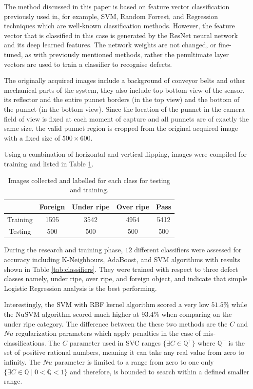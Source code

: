 \documentclass[fleqn,twoside]{article}
\begin{document}
The method discussed in this paper is based on feature vector classification previously used in, for example, SVM, Random Forrest, and Regression techniques which are well-known classification methods. However, the feature vector that is classified in this case is generated by the ResNet neural network and its deep learned features. The network weights are not changed, or fine-tuned, as with previously mentioned methods, rather the penultimate layer vectors are used to train a classifier to recognise defects. 

The originally acquired images include a background of conveyor belts and other mechanical parts of the system, they also include top-bottom view of the sensor, its reflector and the entire punnet borders (in the top view) and the bottom of the punnet (in the bottom view). Since the location of the punnet in the camera field of view is fixed at each moment of capture and all punnets are of exactly the same size, the valid punnet region is cropped from the original acquired image with a fixed size of $500 \times 600$. 

\newpage

Using a combination of horizontal and vertical flipping, images were compiled for training and listed in Table \ref{tab:data}.


\begin{table}[h]
	\centering
	\caption{Images collected and labelled for each class for testing and training.}
	\label{tab:data}
	\begin{tabular}{c c c c c} 
		\hline
		& Foreign & Under ripe & Over ripe & Pass \\ [0.5ex] 
		\hline
		Training & 1595 &  3542 & 4954 &  5412 \\
		Testing & 500 & 500 & 500 & 500 \\ [1ex] 
		\hline
	\end{tabular}
\end{table}



During the research and training phase, $12$ different classifiers were assessed for accuracy including K-Neighbours, AdaBoost, and SVM algorithms with results shown in Table \ref{tab:classifiers}. They were trained with respect to three defect classes namely, under ripe, over ripe, and foreign object, and indicate that simple Logistic Regression analysis is the best performing. 


Interestingly, the SVM with RBF kernel algorithm scored a very low $51.5\%$ while the NuSVM algorithm scored much higher at $93.4\%$ when comparing on the under ripe category. The difference between the these two methods are the $C$ and $Nu$ regularization parameters which apply penalties in the case of mis-classifications. The $C$ parameter used in SVC ranges $\{\exists C\in\mathbb{Q^+}\}$ where $\mathbb{Q^+}$ is the set of positive rational numbers, meaning it can take any real value from zero to infinity. The $Nu$ parameter is limited to a range from zero to one only $\{\exists C\in\mathbb{Q} \mid 0 <\mathbb{Q} < 1\}$ and therefore, is bounded to search within a defined smaller range. 
\end{document}

